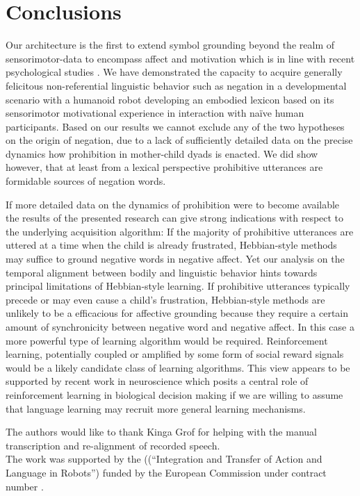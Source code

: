 \section{Conclusions}
Our architecture is the first to extend symbol grounding beyond the realm of sensorimotor-data to encompass affect and motivation which is in line with recent psychological
studies \cite{Kousta2011}. We have demonstrated the capacity to acquire generally felicitous non-referential linguistic behavior such as negation in a developmental scenario with a
humanoid robot developing an embodied lexicon based on its sensorimotor motivational experience in interaction with na\"ive human participants. Based on our results we
cannot exclude any of the two hypotheses on the origin of negation, due to a lack of sufficiently detailed data on the precise dynamics how prohibition in mother-child dyads
is enacted. We did show however, that at least from a lexical perspective prohibitive utterances are formidable sources of negation words.  

If more detailed data on the dynamics of prohibition were to become available the results of the presented research can give strong indications with respect to the underlying
acquisition algorithm: If the majority of prohibitive utterances are uttered at a time when the child is already frustrated, Hebbian-style methods may suffice to ground
negative words in negative affect. Yet our analysis on the temporal alignment between bodily and linguistic behavior hints towards principal limitations of Hebbian-style
learning. If prohibitive utterances typically precede or may even cause a child's frustration, Hebbian-style methods are unlikely to be a efficacious for affective grounding
because they require a certain amount of synchronicity between negative word and negative affect. In this case a more powerful type of learning algorithm would 
be required. Reinforcement learning, potentially coupled or amplified by some form of social reward signals would be a likely candidate class of learning algorithms. 
This view appears to be supported by recent work in neuroscience which posits a central role of reinforcement learning in biological decision making \cite{Niv2009} if we are
willing to assume that language learning may recruit more general learning mechanisms.



\begin{acks}
The authors would like to thank Kinga Grof for helping with the manual transcription and re-alignment of recorded speech.\\
The work was supported by the  ((``Integration and Transfer of Action and Language in Robots'') 
funded by the European Commission under contract number .
\end{acks}

